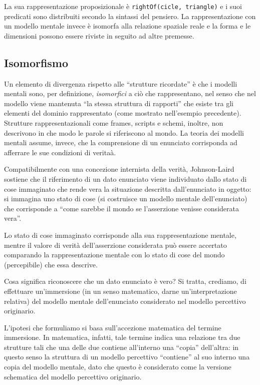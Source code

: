 La sua rappresentazione proposizionale è \texttt{rightOf(cicle, triangle)} e i suoi predicati sono distribuiti secondo la sintassi del pensiero. La rappresentazione con un modello mentale invece è isomorfa alla relazione spaziale reale e la forma e le dimensioni possono essere riviste in seguito ad altre premesse.

\subsection{Isomorfismo}
Un  elemento di divergenza rispetto alle ``strutture ricordate'' è che i modelli mentali sono, per definizione, \emph{isomorfici} a ciò che rappresentano, nel senso che nel modello viene mantenuta ``la stessa struttura di rapporti'' che esiste tra gli elementi del dominio rappresentato (come mostrato nell’esempio precedente). Strutture rappresentazionali come frames, scripts e schemi, inoltre, non descrivono in che modo le parole si riferiscono al mondo. La teoria dei modelli mentali assume, invece, che la comprensione di un enunciato corrisponda ad afferrare le sue condizioni di veritaà.

Compatibilmente con una concezione internista della verità, Johnson-Laird sostiene che il riferimento di un dato enunciato viene individuato dallo stato di cose immaginato che rende vera la situazione descritta dall’enunciato in oggetto: si immagina uno stato di cose (si costruisce un modello mentale dell’enunciato) che corrisponde a “come sarebbe il mondo se l’asserzione venisse considerata vera”.

Lo stato di cose immaginato corrisponde alla sua rappresentazione mentale, mentre il valore di verità dell’asserzione considerata può essere accertato comparando la rappresentazione mentale con lo stato di cose del mondo (percepibile) che essa descrive.

Cosa significa riconoscere che un dato enunciato è vero? Si tratta, crediamo, di effettuare un’immersione (in un senso matematico, darne un’interpretazione relativa) del modello mentale dell’enunciato considerato nel modello percettivo originario.

L’ipotesi che formuliamo si basa sull’accezione matematica del termine immersione. In matematica, infatti, tale termine indica una relazione tra due strutture tali che una delle due contiene all’interno una ``copia'' dell’altra: in questo senso la struttura di un modello percettivo ``contiene'' al suo interno una copia del modello mentale, dato che questo è considerato come la versione schematica del modello percettivo originario.

